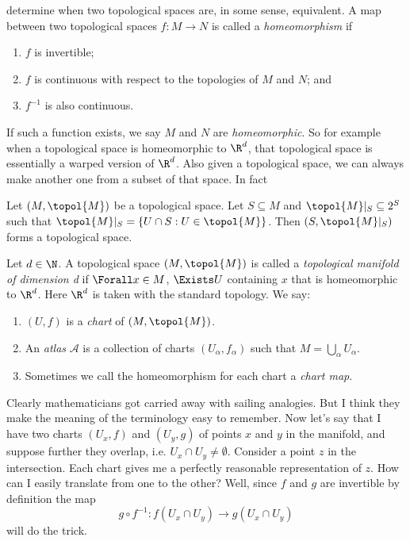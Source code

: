 determine when two topological spaces are, in some sense, equivalent.
A map between two topological spaces $f:M\to N$ is called a 
{\it homeomorphism} if
\begin{enumerate}
  \item $f$ is invertible;
  \item $f$ is continuous with respect to the topologies of $M$ and $N$; and
  \item $f^{-1}$ is also continuous.
\end{enumerate}
If such a function exists, we say $M$ and $N$ are {\it homeomorphic}.
So for example when a topological space is homeomorphic to
$\R^d$, that topological space is essentially a warped version
of $\R^d$. Also given a topological space, we can always make another
one from a subset of that space. In fact
\begin{proposition}{}{}
  Let $(M,\topol{M})$ be a topological space. Let $S\subseteq M$ and
  $\topol{M}|_S\subseteq 2^S$ such that 
  $\topol{M}|_S=\{U\cap S:U\in\topol{M}\}$. Then $(S,\topol{M}|_S)$ forms
  a topological space.
\end{proposition}
Let $d\in\N$. A topological space $(M,\topol{M})$ is called a
{\it topological manifold of dimension d} if $\Forall x\in M$, 
$\Exists U$ containing $x$ that is homeomorphic to $\R^d$. Here
$\R^d$ is taken with the standard topology. We say:
\begin{enumerate}
  \item $(U,f)$ is a {\it chart} of $(M,\topol{M})$.
  \item An {\it atlas} $\mathcal{A}$ is a collection of charts
        $(U_\alpha,f_\alpha)$ such that $M=\bigcup_\alpha U_\alpha$.
  \item Sometimes we call the homeomorphism for each chart a
        {\it chart map}.
\end{enumerate}
Clearly mathematicians got carried away with sailing analogies. But I think
they make the meaning of the terminology easy to remember. Now let's say that
I have two charts $(U_x,f)$ and $(U_y,g)$ of points $x$ and $y$ in the
manifold, and suppose further they overlap, i.e. $U_x\cap U_y\neq\emptyset$.
Consider a point $z$ in the intersection. Each chart gives me a perfectly
reasonable representation of $z$. How can I easily translate from one to the
other? Well, since $f$ and $g$ are invertible by definition the map
$$g\circ f^{-1}:f(U_x\cap U_y)\to g(U_x\cap U_y)$$
will do the trick.
